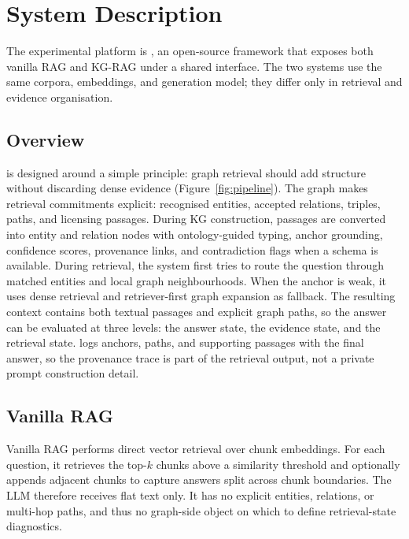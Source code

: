 \section{System Description}
\label{sec:system}

The experimental platform is \system{}, an open-source framework that exposes
both vanilla RAG and KG-RAG under a shared interface.
The two systems use the same corpora, embeddings, and generation model; they
differ only in retrieval and evidence organisation.



\subsection{\system{} Overview}
\label{sec:ontographrag_overview}

\system{} is designed around a simple principle: graph retrieval should add
structure without discarding dense evidence (Figure~\ref{fig:pipeline}).
The graph makes retrieval commitments explicit: recognised entities, accepted
relations, triples, paths, and licensing passages.
During KG construction, passages are converted into entity and relation nodes
with ontology-guided typing, anchor grounding, confidence scores, provenance
links, and contradiction flags when a schema is available.
During retrieval, the system first tries to route the question through matched
entities and local graph neighbourhoods.
When the anchor is weak, it uses dense retrieval and retriever-first graph
expansion as fallback.
The resulting context contains both textual passages and explicit graph paths,
so the answer can be evaluated at three levels: the answer state, the
evidence state, and the retrieval state.
\system{} logs anchors, paths, and supporting passages with the final answer,
so the provenance trace is part of the retrieval output, not a private prompt
construction detail.

\subsection{Vanilla RAG}
\label{sec:vanilla_rag}

Vanilla RAG performs direct vector retrieval over chunk embeddings.
For each question, it retrieves the top-$k$ chunks above a similarity
threshold and optionally appends adjacent chunks to capture answers split
across chunk boundaries.
The LLM therefore receives flat text only.
It has no explicit entities, relations, or multi-hop paths, and thus no
graph-side object on which to define retrieval-state diagnostics.

